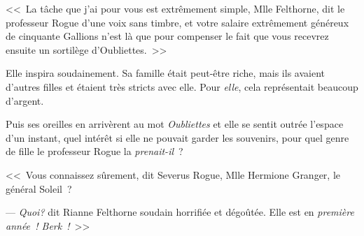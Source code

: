 <<~La tâche que j'ai pour vous est extrêmement simple, Mlle Felthorne, dit le professeur Rogue d'une voix sans timbre, et votre salaire extrêmement généreux de cinquante Gallions n'est là que pour compenser le fait que vous recevrez ensuite un sortilège d'Oubliettes.~>>

Elle inspira soudainement. Sa famille était peut-être riche, mais ils avaient d'autres filles et étaient très stricts avec elle. Pour \emph{elle}, cela représentait beaucoup d'argent.

Puis ses oreilles en arrivèrent au mot \emph{Oubliettes} et elle se sentit outrée l'espace d'un instant, quel intérêt si elle ne pouvait garder les souvenirs, pour quel genre de fille le professeur Rogue la \emph{prenait-il}~?

<<~Vous connaissez sûrement, dit Severus Rogue, Mlle Hermione Granger, le général Soleil~?

--- \emph{Quoi?} dit Rianne Felthorne soudain horrifiée et dégoûtée. Elle est en \emph{première année~! Berk~!}~>> 

